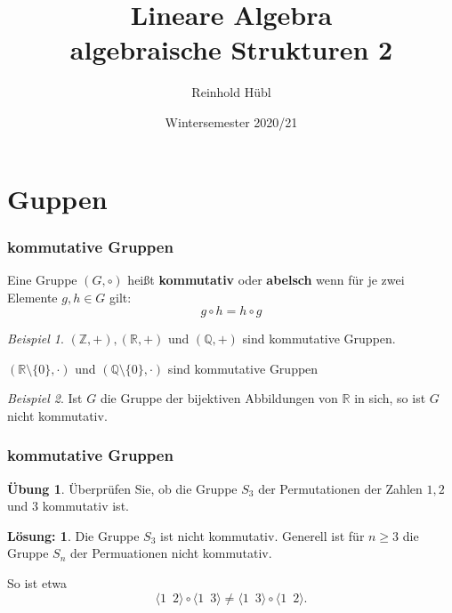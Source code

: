 \documentclass[hyperref={pdfpagelabels=false}]{beamer}
\title{Lineare Algebra \\ algebraische Strukturen 2}
\author{ Reinhold Hübl}
\date{Wintersemester 2020/21}
\theoremstyle{plain}%
\theoremstyle{definition}
\newtheorem*{uebung}{Übung}
\newtheorem*{sol}{Lösung:}
\theoremstyle{remark}
\newtheorem*{beispiel}{Beispiel}
\begin{document}
\begin{frame}
\titlepage
\centering 
 
\end{frame} 



\section{Guppen}


\begin{frame}
\frametitle{kommutative Gruppen}

\begin{definition} Eine Gruppe $(G, \circ)$ heißt \textbf{kommutativ} oder
\textbf{abelsch} wenn für je zwei Elemente $g, h \in G$ gilt:
  	$$ g \circ h = h \circ g $$
\end{definition}

\pause 
\begin{beispiel} $(\mathbb Z, +), (\mathbb R, +)$ und $(\mathbb Q, +)$ sind kommutative Gruppen.

$(\mathbb R \setminus \{0\}, \cdot)$ und $(\mathbb Q  \setminus \{0\}, \cdot)$ sind kommutative Gruppen
\end{beispiel}
\pause 

\begin{beispiel} Ist $G$ die Gruppe der bijektiven Abbildungen von $\mathbb R$ in sich, 
so ist $G$ nicht kommutativ.
\end{beispiel}

\end{frame}

\begin{frame}
\frametitle{kommutative Gruppen}

\begin{uebung} Überprüfen Sie, ob die Gruppe $S_3$ der Permutationen der Zahlen $1, 2$ und $3$ 
kommutativ ist. 
\end{uebung}

\bigbreak

\pause \pause 

\begin{sol} 
Die Gruppe $S_3$ ist nicht kommutativ. Generell ist 
für $n \geq 3$ die Gruppe $S_n$ der Permuationen  nicht 
kommutativ. 

\pause 
So ist etwa 
	$$\langle 1 \,\,\, 2 \rangle \circ \langle 1 \,\,\, 3 \rangle 
	\neq \langle 1 \,\,\, 3 \rangle \circ \langle 1 \,\,\, 2 \rangle.$$
\end{sol}

\end{frame}
\end{document}
